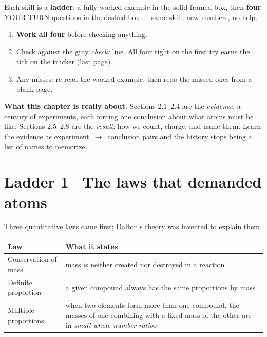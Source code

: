 \documentclass{apchem-worksheet}
\begin{document}
\apctitleblock

\begin{apcnote}
Each skill is a \textbf{ladder}: a fully worked example in the
solid-framed box, then \textbf{four} YOUR TURN questions in the dashed
box --- same skill, new numbers, no help.

\begin{enumerate}[leftmargin=*,itemsep=0.15em]
  \item \textbf{Work all four} before checking anything.
  \item Check against the gray \emph{check:} line. All four right on the
        first try earns the tick on the tracker (last page).
  \item Any misses: re-read the worked example, then redo the missed ones
        from a blank page.
\end{enumerate}

\textbf{What this chapter is really about.} Sections 2.1--2.4 are the
\emph{evidence}: a century of experiments, each forcing one conclusion
about what atoms must be like. Sections 2.5--2.8 are the \emph{result}:
how we count, charge, and name them. Learn the evidence as
experiment~$\to$~conclusion pairs and the history stops being a list of
names to memorize.
\end{apcnote}

\section*{\sffamily Ladder 1 \textbullet\ The laws that demanded atoms}

Three quantitative laws came first; Dalton's theory was invented to
explain them.

\begin{center}
\renewcommand{\arraystretch}{1.25}
\begin{tabular}{@{}p{3.6cm}p{9.6cm}@{}}
\hline
\textbf{Law} & \textbf{What it states} \\
\hline
Conservation of mass & mass is neither created nor destroyed in a
  reaction \\
Definite proportion & a given compound always has the same proportions
  by mass \\
Multiple proportions & when two elements form more than one compound,
  the masses of one combining with a fixed mass of the other are in
  \emph{small whole-number ratios} \\
\hline
\end{tabular}
\end{center}
\end{document}
